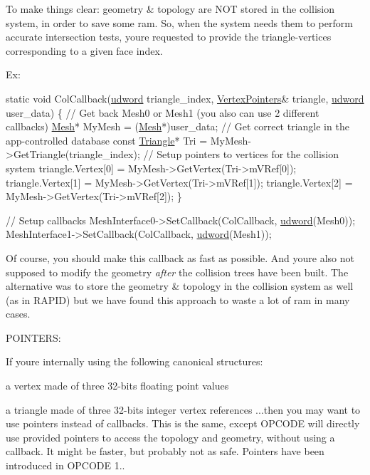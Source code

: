 To make things clear\+: geometry \& topology are N\+OT stored in the collision system, in order to save some ram. So, when the system needs them to perform accurate intersection tests, you\textquotesingle{}re requested to provide the triangle-\/vertices corresponding to a given face index.

Ex\+:


\begin{DoxyCode}
\textcolor{keyword}{static} \textcolor{keywordtype}{void} ColCallback(\hyperlink{IceTypes_8h_a44c6f1920ba5551225fb534f9d1a1733}{udword} triangle\_index, \hyperlink{structVertexPointers}{VertexPointers}& triangle, 
      \hyperlink{IceTypes_8h_a44c6f1920ba5551225fb534f9d1a1733}{udword} user\_data)
\{
    \textcolor{comment}{// Get back Mesh0 or Mesh1 (you also can use 2 different callbacks)}
    \hyperlink{classMesh}{Mesh}* MyMesh = (\hyperlink{classMesh}{Mesh}*)user\_data;
    \textcolor{comment}{// Get correct triangle in the app-controlled database}
    \textcolor{keyword}{const} \hyperlink{classTriangle}{Triangle}* Tri = MyMesh->GetTriangle(triangle\_index);
    \textcolor{comment}{// Setup pointers to vertices for the collision system}
    triangle.Vertex[0] = MyMesh->GetVertex(Tri->mVRef[0]);
    triangle.Vertex[1] = MyMesh->GetVertex(Tri->mVRef[1]);
    triangle.Vertex[2] = MyMesh->GetVertex(Tri->mVRef[2]);
\}

\textcolor{comment}{// Setup callbacks}
MeshInterface0->SetCallback(ColCallback, \hyperlink{IceTypes_8h_a44c6f1920ba5551225fb534f9d1a1733}{udword}(Mesh0));
MeshInterface1->SetCallback(ColCallback, \hyperlink{IceTypes_8h_a44c6f1920ba5551225fb534f9d1a1733}{udword}(Mesh1));
\end{DoxyCode}


Of course, you should make this callback as fast as possible. And you\textquotesingle{}re also not supposed to modify the geometry {\itshape after} the collision trees have been built. The alternative was to store the geometry \& topology in the collision system as well (as in R\+A\+P\+ID) but we have found this approach to waste a lot of ram in many cases.

P\+O\+I\+N\+T\+E\+RS\+:

If you\textquotesingle{}re internally using the following canonical structures\+:
\begin{DoxyItemize}
\item a vertex made of three 32-\/bits floating point values
\item a triangle made of three 32-\/bits integer vertex references ...then you may want to use pointers instead of callbacks. This is the same, except O\+P\+C\+O\+DE will directly use provided pointers to access the topology and geometry, without using a callback. It might be faster, but probably not as safe. Pointers have been introduced in O\+P\+C\+O\+DE 1..
\end{DoxyItemize}

